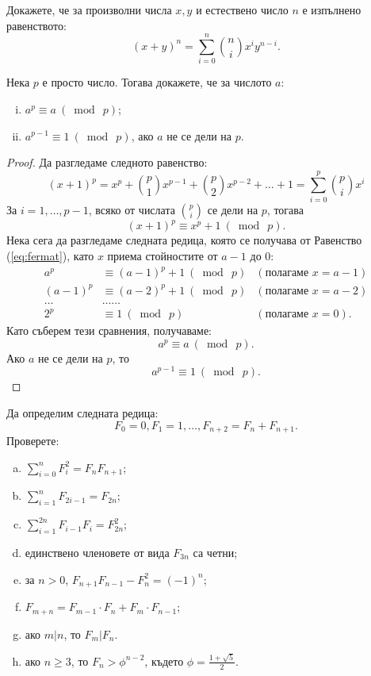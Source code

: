 \begin{problem}
  Докажете, че за произволни числа $x,y$ и естествено число $n$ е изпълнено равенството:
  \[(x+y)^n = \sum^{n}_{i=0}\binom{n}{i}x^iy^{n-i}.\]
\end{problem}
\begin{problem}
  Нека $p$ е просто число. Тогава докажете, че за числото $a$:
  \begin{enumerate}[i)]
  \item
    $a^p \equiv a\ (\bmod\ p)$;
  \item 
    $a^{p-1} \equiv 1\ (\bmod\ p)$, ако $a$ не се дели на $p$.
  \end{enumerate}
\end{problem}
\begin{proof}
  Да разгледаме следното равенство:
  \[(x+1)^p = x^p + \binom{p}{1}x^{p-1} + \binom{p}{2}x^{p-2} + \dots + 1 = \sum^{p}_{i=0}\binom{p}{i}x^i\]
  За $i = 1,\dots,p-1$, всяко от числата $\binom{p}{i}$ се дели на $p$, тогава
  \begin{equation}
    \label{eq:fermat}
    (x+1)^p \equiv x^p + 1\ (\bmod\ p).
  \end{equation}
  Нека сега да разгледаме следната редица, която се получава от Равенство (\ref{eq:fermat}), като $x$ приема стойностите от $a-1$ до $0$:
  \begin{align*}
    a^p & \equiv (a-1)^p+1\ (\bmod\ p) & (\text{полагаме }x = a-1)\\
    (a-1)^p & \equiv (a-2)^p+1\ (\bmod\ p) & (\text{полагаме }x = a-2)\\
    \dots & \dots\dots\\
    2^p & \equiv 1\ (\bmod\ p) & (\text{полагаме }x = 0).
  \end{align*}
  Като съберем тези сравнения, получаваме:
  \[a^p \equiv a\ (\bmod\ p).\]
  Ако $a$ не се дели на $p$, то
  \[a^{p-1} \equiv 1\ (\bmod\ p).\]
\end{proof}

\begin{problem}
  Да определим следната редица:
  \[F_0 = 0,F_1 = 1,\dots,F_{n+2} = F_{n} + F_{n+1}.\]
  Проверете:
  \begin{enumerate}[a)]
  \item
    $\sum^n_{i=0} F^2_i = F_{n}F_{n+1}$;
  \item
    $\sum^n_{i=1} F_{2i-1} = F_{2n}$;
  \item
    $\sum^{2n}_{i=1}F_{i-1}F_{i} = F^2_{2n}$;
  \item
    единствено членовете от вида $F_{3n}$ са четни;
  \item
    за $n > 0$, $F_{n+1}F_{n-1} - F^2_n = (-1)^n$;
  \item
    $F_{m+n} = F_{m-1}\cdot F_{n} + F_m \cdot F_{n-1}$;
  \item
    ако $m\vert n$, то $F_m \vert F_n$.
  \item
    ако $n\geq 3$, то $F_n > \phi^{n-2}$,
    където $\phi = \frac{1+\sqrt{5}}{2}$.
  \end{enumerate}
\end{problem}

